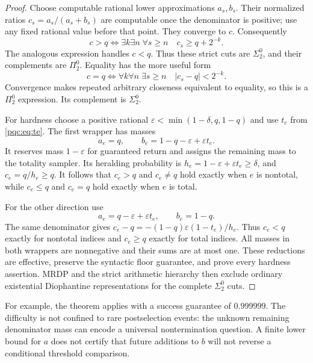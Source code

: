\documentclass[11pt,letterpaper]{article}
\numberwithin{equation}{section}
\theoremstyle{definition}
\theoremstyle{remark}
\newcommand{\sigtwo}{\Sigma^0_2}
\newcommand{\pitwo}{\Pi^0_2}
\begin{document}
\begin{proof}
Choose computable rational lower approximations $a_s,b_s$. Their normalized
ratios $c_s=a_s/(a_s+b_s)$ are computable once the denominator is positive;
use any fixed rational value before that point. They converge to $c$.
Consequently
\begin{equation}\label{pqc:eq:strictsigma2}
 c>q\iff\exists k\exists n\;\forall s\ge n\quad c_s\ge q+2^{-k}.
\end{equation}
The analogous expression handles $c<q$. Thus these strict cuts are
$\sigtwo$, and their complements are $\pitwo$. Equality has the more useful
form
\begin{equation}\label{pqc:eq:eqpi2}
 c=q\iff\forall k\forall n\;\exists s\ge n\quad |c_s-q|<2^{-k}.
\end{equation}
Convergence makes repeated arbitrary closeness equivalent to equality, so
this is a $\pitwo$ expression. Its complement is $\sigtwo$.

For hardness choose a positive rational
$\varepsilon<\min(1-\delta,q,1-q)$ and use $t_e$ from \eqref{pqc:eq:te}.
The first wrapper has masses
\begin{equation}\label{pqc:eq:hardplus}
 a_e=q,\qquad b_e=1-q-\varepsilon+\varepsilon t_e.
\end{equation}
It reserves mass $1-\varepsilon$ for guaranteed return and assigns the
remaining mass to the totality sampler. Its heralding probability is
$h_e=1-\varepsilon+\varepsilon t_e\ge\delta$, and
$c_e=q/h_e\ge q$. It follows that $c_e>q$ and $c_e\ne q$ hold exactly
when $e$ is nontotal, while $c_e\le q$ and $c_e=q$ hold exactly when $e$
is total.

For the other direction use
\begin{equation}\label{pqc:eq:hardminus}
 a_e=q-\varepsilon+\varepsilon t_e,\qquad b_e=1-q.
\end{equation}
The same denominator gives
$c_e-q=-(1-q)\varepsilon(1-t_e)/h_e$. Thus $c_e<q$ exactly for nontotal
indices and $c_e\ge q$ exactly for total indices. All masses in both
wrappers are nonnegative and their sums are at most one. These reductions
are effective, preserve the syntactic floor guarantee, and prove every
hardness assertion. MRDP and the strict arithmetic hierarchy then exclude
ordinary existential Diophantine representations for the complete
$\sigtwo$ cuts.
\end{proof}

For example, the theorem applies with a success guarantee of $0.999999$.
The difficulty is not confined to rare postselection events: the unknown
remaining denominator mass can encode a universal nontermination question.
A finite lower bound for $a$ does not certify that future additions to $b$
will not reverse a conditional threshold comparison.
\end{document}
